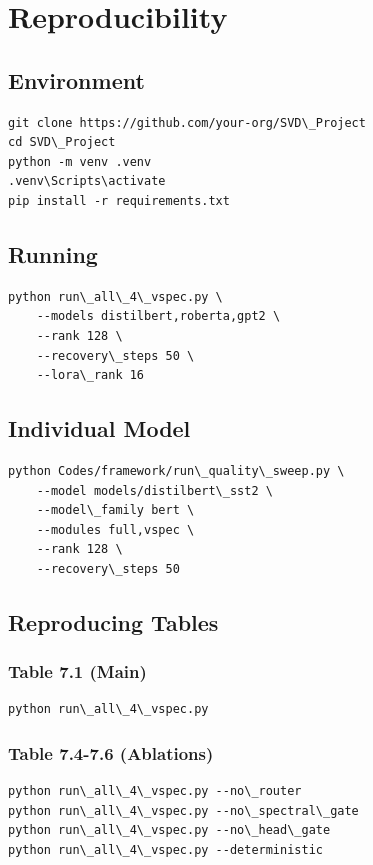 \section{Reproducibility}

\subsection{Environment}

\begin{lstlisting}
git clone https://github.com/your-org/SVD\_Project
cd SVD\_Project
python -m venv .venv
.venv\Scripts\activate
pip install -r requirements.txt
\end{lstlisting}

\subsection{Running}

\begin{lstlisting}
python run\_all\_4\_vspec.py \
    --models distilbert,roberta,gpt2 \
    --rank 128 \
    --recovery\_steps 50 \
    --lora\_rank 16
\end{lstlisting}

\subsection{Individual Model}

\begin{lstlisting}
python Codes/framework/run\_quality\_sweep.py \
    --model models/distilbert\_sst2 \
    --model\_family bert \
    --modules full,vspec \
    --rank 128 \
    --recovery\_steps 50
\end{lstlisting}

\subsection{Reproducing Tables}

\subsubsection{Table 7.1 (Main)}
\begin{lstlisting}
python run\_all\_4\_vspec.py
\end{lstlisting}

\subsubsection{Table 7.4-7.6 (Ablations)}
\begin{lstlisting}
python run\_all\_4\_vspec.py --no\_router
python run\_all\_4\_vspec.py --no\_spectral\_gate
python run\_all\_4\_vspec.py --no\_head\_gate
python run\_all\_4\_vspec.py --deterministic
\end{lstlisting}

